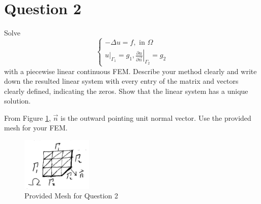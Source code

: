 \section{Question 2}

\begin{question}
    Solve $$\left\{\begin{array}{l}-\Delta u=f, \text { in } \Omega \\ \left.u\right|_{\Gamma_1}=g_1,\left.\frac{\partial u}{\partial \vec{n}}\right|_{\Gamma_2}=g_2\end{array}\right.$$
    with a piecewise linear continuous FEM. Describe your method clearly and write down the resulted linear system with every entry of the matrix and vectors clearly defined, indicating the zeros. Show that the linear system has a unique solution.
    
    From Figure \ref{fig:fig1}, $\vec{n}$ is the outward pointing unit normal vector. Use the provided mesh for your FEM.
    
    \begin{figure}[H]
        \centering
        \includegraphics[width=0.3\textwidth]{Figure1.jpeg}
        \caption{\label{fig:fig1}Provided Mesh for Question 2}
    \end{figure}
\end{question}

\begin{answer}
    
\end{answer}